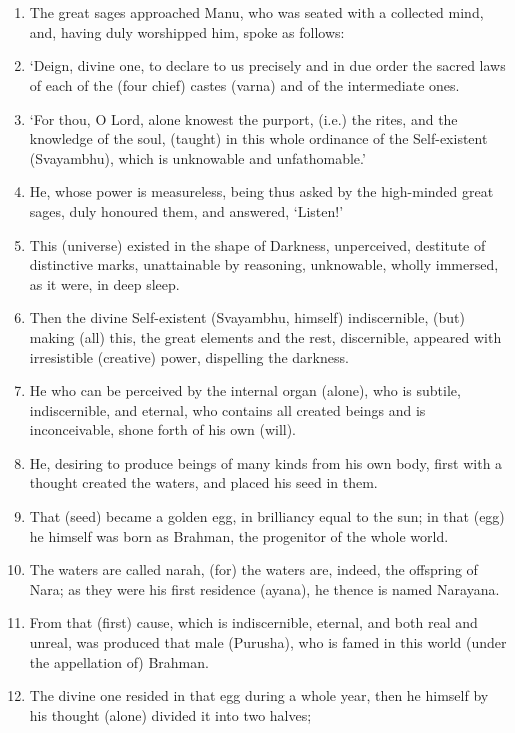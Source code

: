 \chapter{}
\begin{enumerate}
\item The great sages approached Manu, who was seated with a collected mind, and, having duly worshipped him, spoke as follows:
\item `Deign, divine one, to declare to us precisely and in due order the sacred laws of each of the (four chief) castes (varna) and of the intermediate ones.
\item `For thou, O Lord, alone knowest the purport, (i.e.) the rites, and the knowledge of the soul, (taught) in this whole ordinance of the Self-existent (Svayambhu), which is unknowable and unfathomable.'
\item He, whose power is measureless, being thus asked by the high-minded great sages, duly honoured them, and answered, `Listen!'
\item This (universe) existed in the shape of Darkness, unperceived, destitute of distinctive marks, unattainable by reasoning, unknowable, wholly immersed, as it were, in deep sleep.
\item Then the divine Self-existent (Svayambhu, himself) indiscernible, (but) making (all) this, the great elements and the rest, discernible, appeared with irresistible (creative) power, dispelling the darkness.
\item He who can be perceived by the internal organ (alone), who is subtile, indiscernible, and eternal, who contains all created beings and is inconceivable, shone forth of his own (will).
\item He, desiring to produce beings of many kinds from his own body, first with a thought created the waters, and placed his seed in them.
\item That (seed) became a golden egg, in brilliancy equal to the sun; in that (egg) he himself was born as Brahman, the progenitor of the whole world.
\item The waters are called narah, (for) the waters are, indeed, the offspring of Nara; as they were his first residence (ayana), he thence is named Narayana.
\item From that (first) cause, which is indiscernible, eternal, and both real and unreal, was produced that male (Purusha), who is famed in this world (under the appellation of) Brahman.
\item The divine one resided in that egg during a whole year, then he himself by his thought (alone) divided it into two halves;

\end{enumerate}
